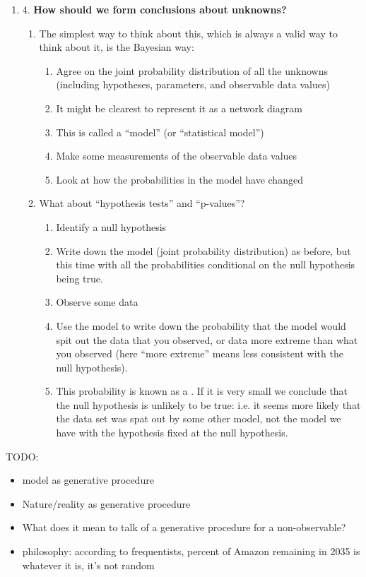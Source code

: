 \begin{enumerate}
\item 4. {\bf How should we form conclusions about unknowns?}
  \begin{enumerate}
  \item The simplest way to think about this, which is always a valid way to think about it, is the Bayesian way:
    \begin{enumerate}
    \item Agree on the joint probability distribution of all the unknowns (including hypotheses, parameters, and observable data values)
    \item It might be clearest to represent it as a network diagram
    \item This is called a ``model​'' (or ``statistical model​'')
    \item Make some measurements of the observable data values
    \item Look at how the probabilities in the model have changed
    \end{enumerate}
  \item What about ``hypothesis tests​'' and ``p-values​''?
    \begin{enumerate}
    \item Identify a null hypothesis
    \item Write down the model (joint probability distribution) as before, but this time with all the probabilities
      conditional on the null hypothesis being true.
    \item Observe some data
    \item Use the model to write down the probability that the model would spit out the data that you observed, or
      data more extreme than what you observed (here ``more extreme​'' means less consistent with the null
      hypothesis).
    \item This probability is known as a . If it is very small we conclude that the null hypothesis is unlikely
      to be true: i.e. it seems more likely that the data set was spat out by some other model, not the model
      we have with the hypothesis fixed at the null hypothesis.
    \end{enumerate}
  \end{enumerate}
\end{enumerate}




TODO:

\begin{itemize}
\item model as generative procedure
\item Nature/reality as generative procedure
\item What does it mean to talk of a generative procedure for a non-observable?
\item philosophy: according to frequentists, percent of Amazon remaining in 2035 is whatever it is, it's not random
\end{itemize}




